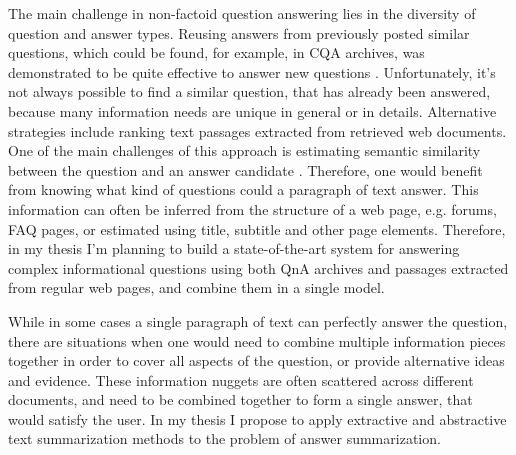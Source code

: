 The main challenge in non-factoid question answering lies in the diversity of question and answer types.
Reusing answers from previously posted similar questions, which could be found, for example, in CQA archives, was demonstrated to be quite effective to answer new questions \cite{carmel2000eresponder,Shtok:2012:LPA:2187836.2187939}.
Unfortunately, it's not always possible to find a similar question, that has already been answered, because many information needs are unique in general or in details.
Alternative strategies include ranking text passages extracted from retrieved web documents.
One of the main challenges of this approach is estimating semantic similarity between the question and an answer candidate \cite{soricut2006automatic}.
Therefore, one would benefit from knowing what kind of questions could a paragraph of text answer.
This information can often be inferred from the structure of a web page, e.g. forums, FAQ pages, or estimated using title, subtitle and other page elements.
Therefore, in my thesis I'm planning to build a state-of-the-art system for answering complex informational questions using both QnA archives and passages extracted from regular web pages, and combine them in a single model.

While in some cases a single paragraph of text can perfectly answer the question, there are situations when one would need to combine multiple information pieces together in order to cover all aspects of the question, or provide alternative ideas and evidence.
These information nuggets are often scattered across different documents, and need to be combined together to form a single answer, that would satisfy the user.
In my thesis I propose to apply extractive and abstractive text summarization methods to the problem of answer summarization.


